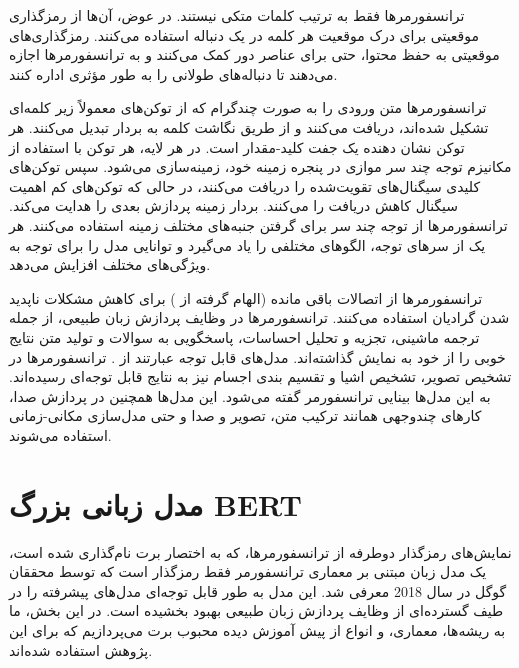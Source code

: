ترانسفورمرها فقط به ترتیب کلمات متکی نیستند. در عوض، آن‌ها از رمزگذاری موقعیتی برای درک موقعیت هر کلمه در یک دنباله استفاده می‌کنند. رمزگذاری‌های موقعیتی به حفظ محتوا، حتی برای عناصر دور کمک می‌کنند و به ترانسفورمرها اجازه می‌دهند تا دنباله‌های طولانی را به طور مؤثری اداره کنند.

ترانسفورمرها متن ورودی را به صورت چندگرام که از توکن‌‌های معمولاً زیر کلمه‌ای تشکیل شده‌اند، دریافت می‌کنند و از طریق نگاشت کلمه به بردار تبدیل می‌کنند. هر توکن نشان دهنده یک جفت کلید-مقدار است. در هر لایه، هر توکن با استفاده از مکانیزم توجه چند سر موازی در پنجره زمینه خود، زمینه‌سازی می‌شود.
سپس توکن‌های کلیدی سیگنال‌های تقویت‌شده را دریافت می‌کنند، در حالی که توکن‌های کم اهمیت‌ سیگنال کاهش دریافت را می‌کنند. بردار زمینه پردازش بعدی را هدایت می‌کند.
ترانسفورمرها از توجه چند سر برای گرفتن جنبه‌های مختلف زمینه استفاده می‌کنند. هر یک از سر‌های توجه، الگوهای مختلفی را یاد می‌گیرد و توانایی مدل را برای توجه به ویژگی‌های مختلف افزایش می‌دهد.

ترانسفورمرها از اتصالات باقی مانده (الهام گرفته از \cite{he2015deep}) برای کاهش مشکلات ناپدید شدن گرادیان استفاده می‌کنند. ترانسفورمرها در وظایف پردازش زبان طبیعی، از جمله ترجمه ماشینی، تجزیه و تحلیل احساسات، پاسخگویی به سوالات و تولید متن نتایج خوبی را از خود به نمایش گذاشته‌اند. مدل‌های قابل توجه عبارتند از .\cite{devlin2018bert}\cite{radford2018improving}\cite{t5} ترانسفورمرها در تشخیص تصویر، تشخیص اشیا و تقسیم بندی اجسام نیز به نتایج قابل توجه‌ای رسیده‌اند. به این مدل‌ها بینایی ترانسفورمر گفته می‌شود. این مدل‌ها همچنین در پردازش صدا، کارهای چندوجهی همانند ترکیب متن، تصویر و صدا و حتی مدل‌سازی مکانی-زمانی استفاده می‌شوند.

\section{مدل زبانی بزرگ BERT}
\hspace{30pt}
نمایش‌های رمزگذار دوطرفه از ترانسفورمرها، که به اختصار برت  نام‌گذاری شده است، یک مدل زبان مبتنی بر معماری ترانسفورمر فقط رمزگذار است که توسط محققان گوگل در سال 2018 معرفی شد.\cite{devlin2018bert} این مدل به طور قابل توجه‌ای مدل‌های پیشرفته را در طیف گسترده‌ای از وظایف پردازش زبان طبیعی بهبود بخشیده است. در این بخش، ما به ریشه‌ها، معماری، و انواع از پیش آموزش دیده محبوب برت می‌پردازیم که برای این پژوهش استفاده شده‌اند.

